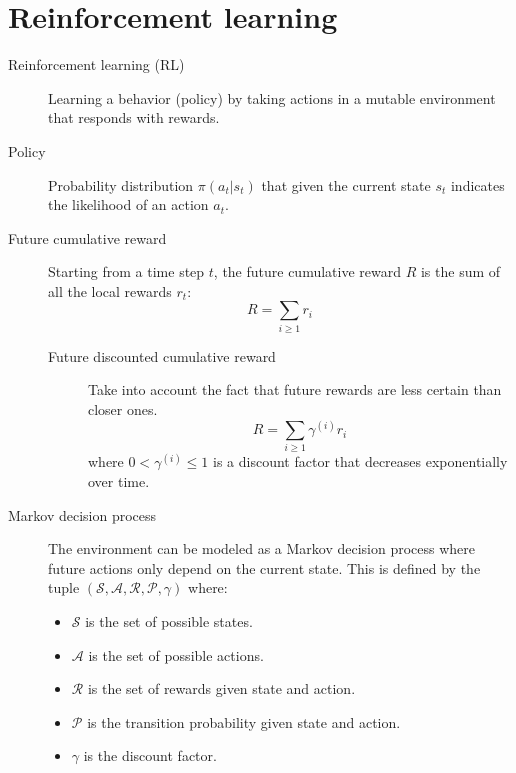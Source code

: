 \chapter{Reinforcement learning}


\begin{description}
    \item[Reinforcement learning (RL)] 
        Learning a behavior (policy) by taking actions in a mutable environment that responds with rewards.

    \item[Policy] 
        Probability distribution $\pi(a_t | s_t)$ that given the current state $s_t$ indicates 
        the likelihood of an action $a_t$.

    \item[Future cumulative reward] 
        Starting from a time step $t$, the future cumulative reward $R$ is the sum of all the local rewards $r_t$:
        \[ R = \sum_{i \geq 1} r_i \]

        \begin{description}
            \item[Future discounted cumulative reward]  
                Take into account the fact that future rewards are less certain than closer ones.
                \[ R = \sum_{i \geq 1} \gamma^{(i)} r_i \]
                where $0 <\gamma^{(i)} \leq 1$ is a discount factor that decreases exponentially over time.
        \end{description}

    \item[Markov decision process] 
        The environment can be modeled as a Markov decision process where future actions only depend on the current state.
        This is defined by the tuple $(\mathcal{S}, \mathcal{A}, \mathcal{R}, \mathcal{P}, \gamma)$
        where:
        \begin{itemize}
            \item $\mathcal{S}$ is the set of possible states.
            \item $\mathcal{A}$ is the set of possible actions.
            \item $\mathcal{R}$ is the set of rewards given state and action.
            \item $\mathcal{P}$ is the transition probability given state and action.
            \item $\gamma$ is the discount factor.
        \end{itemize}


\end{description}

